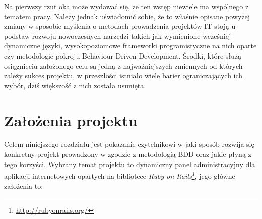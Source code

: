   Na pierwszy rzut oka może wydawać się, że ten wstęp niewiele ma wspólnego z tematem pracy. Należy jednak uświadomić sobie, że to właśnie opisane powyżej zmiany w sposobie myślenia o metodach prowadzenia projektów IT stoją u podstaw rozwoju nowoczesnych narzędzi takich jak wymienione wcześniej dynamiczne języki, wysokopoziomowe frameworki programistyczne na nich oparte czy metodologie pokroju Behaviour Driven Development. Środki, które służą osiągnięciu założonego celu są jedną z najważniejszych zmiennych od których zależy sukces projektu, w przeszłości istniało wiele barier ograniczających ich wybór, dziś większość z nich została usunięta.
  
  \section{Założenia projektu}
  Celem niniejszego rozdziału jest pokazanie czytelnikowi w jaki sposób rozwija się konkretny projekt prowadzony w zgodzie z metodologią BDD oraz jakie płyną z tego korzyści. Wybrany temat projektu to dynamiczny panel administracyjny dla aplikacji internetowych opartych na bibliotece \emph{Ruby on Rails\footnote{\url{http://rubyonrails.org/}}}, jego główne założenia to:
  
